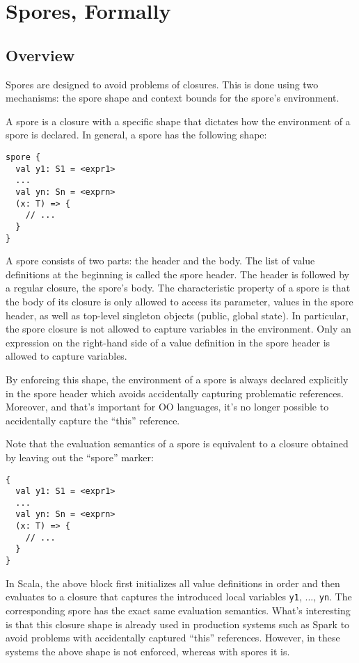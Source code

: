 \chapter{Spores, Formally}
\label{appdx:spores-formally}

\section{Overview}

Spores are designed to avoid problems of closures. This is done using two
mechanisms: the spore shape and context bounds for the spore's environment.

A spore is a closure with a specific shape that dictates how the environment of
a spore is declared. In general, a spore has the following shape:

\begin{verbatim}
spore {
  val y1: S1 = <expr1>
  ...
  val yn: Sn = <exprn>
  (x: T) => {
    // ...
  }
}
\end{verbatim}

A spore consists of two parts: the header and the body. The list of value
definitions at the beginning is called the spore header. The header is followed
by a regular closure, the spore's body. The characteristic property of a spore
is that the body of its closure is only allowed to access its parameter, values
in the spore header, as well as top-level singleton objects (public, global
state). In particular, the spore closure is not allowed to capture variables in
the environment. Only an expression on the right-hand side of a value definition
in the spore header is allowed to capture variables.

By enforcing this shape, the environment of a spore is always declared
explicitly in the spore header which avoids accidentally capturing problematic
references. Moreover, and that's important for OO languages, it's no longer
possible to accidentally capture the ``this'' reference.

Note that the evaluation semantics of a spore is equivalent to a closure
obtained by leaving out the ``spore'' marker:

\begin{verbatim}
{
  val y1: S1 = <expr1>
  ...
  val yn: Sn = <exprn>
  (x: T) => {
    // ...
  }
}
\end{verbatim}

In Scala, the above block first initializes all value definitions in order and
then evaluates to a closure that captures the introduced local variables
\verb|y1|, ..., \verb|yn|. The corresponding spore has the exact same evaluation
semantics. What's interesting is that this closure shape is already used in
production systems such as Spark to avoid problems with accidentally captured
``this'' references. However, in these systems the above shape is not enforced,
whereas with spores it is.

